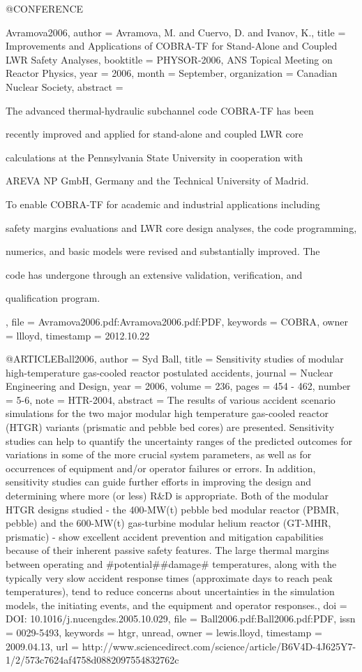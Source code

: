 @CONFERENCE{Avramova2006,
  author = {Avramova, M. and Cuervo, D. and Ivanov, K.},
  title = {Improvements and Applications of {COBRA-TF} for Stand-Alone and Coupled
	{LWR} Safety Analyses},
  booktitle = {{PHYSOR}-2006, ANS Topical Meeting on Reactor Physics},
  year = {2006},
  month = {September},
  organization = {Canadian Nuclear Society},
  abstract = {The advanced thermal-hydraulic subchannel code COBRA-TF has been 
	
	recently improved and applied for stand-alone and coupled LWR core
	
	
	calculations at the Pennsylvania State University in cooperation with
	
	
	AREVA NP GmbH, Germany and the Technical University of Madrid. 
	
	To enable COBRA-TF for academic and industrial applications including
	
	
	safety margins evaluations and LWR core design analyses, the code
	programming, 
	
	numerics, and basic models were revised and substantially improved.
	The 
	
	code has undergone through an extensive validation, verification,
	and 
	
	qualification program.},
  file = {Avramova2006.pdf:Avramova2006.pdf:PDF},
  keywords = {COBRA},
  owner = {llloyd},
  timestamp = {2012.10.22}
}

@ARTICLE{Ball2006,
  author = {Syd Ball},
  title = {Sensitivity studies of modular high-temperature gas-cooled reactor
	postulated accidents},
  journal = {Nuclear Engineering and Design},
  year = {2006},
  volume = {236},
  pages = {454 - 462},
  number = {5-6},
  note = {HTR-2004},
  abstract = {The results of various accident scenario simulations for the two major
	modular high temperature gas-cooled reactor (HTGR) variants (prismatic
	and pebble bed cores) are presented. Sensitivity studies can help
	to quantify the uncertainty ranges of the predicted outcomes for
	variations in some of the more crucial system parameters, as well
	as for occurrences of equipment and/or operator failures or errors.
	In addition, sensitivity studies can guide further efforts in improving
	the design and determining where more (or less) R&D is appropriate.
	Both of the modular HTGR designs studied - the 400-MW(t) pebble bed
	modular reactor (PBMR, pebble) and the 600-MW(t) gas-turbine modular
	helium reactor (GT-MHR, prismatic) - show excellent accident prevention
	and mitigation capabilities because of their inherent passive safety
	features. The large thermal margins between operating and #potential##damage#
	temperatures, along with the typically very slow accident response
	times (approximate days to reach peak temperatures), tend to reduce
	concerns about uncertainties in the simulation models, the initiating
	events, and the equipment and operator responses.},
  doi = {DOI: 10.1016/j.nucengdes.2005.10.029},
  file = {Ball2006.pdf:Ball2006.pdf:PDF},
  issn = {0029-5493},
  keywords = {htgr, unread},
  owner = {lewis.lloyd},
  timestamp = {2009.04.13},
  url = {http://www.sciencedirect.com/science/article/B6V4D-4J625Y7-1/2/573c7624af4758d0882097554832762c}
}

